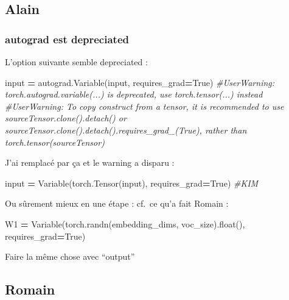 \documentclass[11pt,french,french]{article}
\newenvironment{Shaded}{\begin{snugshade}}{\end{snugshade}}
\newcommand{\BuiltInTok}[1]{#1}
\newcommand{\CommentTok}[1]{\textcolor[rgb]{0.56,0.35,0.01}{\textit{#1}}}
\newcommand{\NormalTok}[1]{#1}
\newcommand{\OperatorTok}[1]{\textcolor[rgb]{0.81,0.36,0.00}{\textbf{#1}}}
\newcommand{\VariableTok}[1]{\textcolor[rgb]{0.00,0.00,0.00}{#1}}
\begin{document}
\hypertarget{alain}{%
\subsection{Alain}\label{alain}}

\hypertarget{autograd-est-depreciated}{%
\subsubsection{autograd est
depreciated}\label{autograd-est-depreciated}}

L'option suivante semble depreciated :

\begin{Shaded}
\begin{Highlighting}[]
\BuiltInTok{input} \OperatorTok{=}\NormalTok{ autograd.Variable(}\BuiltInTok{input}\NormalTok{, requires_grad}\OperatorTok{=}\VariableTok{True}\NormalTok{)}
\CommentTok{#UserWarning: torch.autograd.variable(...) is deprecated, use torch.tensor(...) instead}
\CommentTok{#UserWarning: To copy construct from a tensor, it is recommended to use sourceTensor.clone().detach() or  sourceTensor.clone().detach().requires_grad_(True), rather than torch.tensor(sourceTensor)}
\end{Highlighting}
\end{Shaded}

J'ai remplacé par ça et le warning a disparu :

\begin{Shaded}
\begin{Highlighting}[]
\BuiltInTok{input} \OperatorTok{=}\NormalTok{ Variable(torch.Tensor(}\BuiltInTok{input}\NormalTok{), requires_grad}\OperatorTok{=}\VariableTok{True}\NormalTok{) }\CommentTok{#KIM}
\end{Highlighting}
\end{Shaded}

Ou sûrement mieux en une étape : cf.~ce qu'a fait Romain :

\begin{Shaded}
\begin{Highlighting}[]
\NormalTok{W1 }\OperatorTok{=}\NormalTok{ Variable(torch.randn(embedding_dims, voc_size).}\BuiltInTok{float}\NormalTok{(), requires_grad}\OperatorTok{=}\VariableTok{True}\NormalTok{)}
\end{Highlighting}
\end{Shaded}

Faire la même chose avec ``output''

\hypertarget{romain}{%
\subsection{Romain}\label{romain}}
\end{document}
